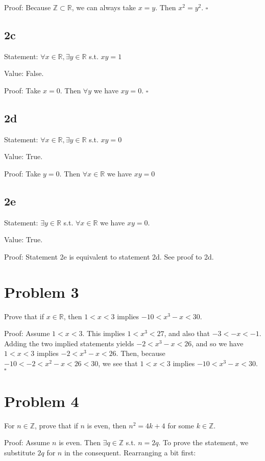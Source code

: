 \documentclass{article}
\begin{document}
Proof: Because $\mathbb{Z} \subset \mathbb{R}$, we can always take $x = y$. Then $x^2 = y^2$. $\square$
\subsection*{2c}
Statement: $\forall x \in \mathbb{R}, \exists y \in \mathbb{R}$ s.t. $xy = 1$

Value: False. 

Proof: Take $x = 0$. Then $\forall y$ we have $xy = 0.$ $\square$
\subsection*{2d}
Statement: $\forall x \in \mathbb{R}, \exists y \in \mathbb{R}$ s.t. $xy = 0$

Value: True. 

Proof: Take $y = 0$. Then $\forall x \in \mathbb{R}$ we have $xy = 0$
\subsection*{2e}
Statement: $\exists y \in \mathbb{R}$ s.t. $\forall x \in \mathbb{R}$ we have $xy = 0$. 

Value: True.

Proof: Statement 2e is equivalent to statement 2d. See proof to 2d. 

\section*{Problem 3}
Prove that if $x \in \mathbb{R}$, then $1 < x < 3$ implies $-10 < x^3 - x < 30$.  

Proof: Assume $1 < x < 3$. This implies $1 < x^3 < 27$, and also that  $-3 < -x < -1$. Adding the two implied statements yields $-2 < x^3 - x < 26$, and so we have $1 < x < 3 $ implies $-2 < x^3 - x < 26$. Then, because $-10 < -2 < x^2 - x < 26 < 30$, we see that $1 < x < 3$ implies $-10 < x^3 - x < 30$. $\square$

\newpage
\section*{Problem 4}
For $n \in \mathbb{Z}$, prove that if $n$ is even, then $n^2 = 4k + 4$ for some $k \in \mathbb{Z}$.  

Proof: Assume $n$ is even. Then $\exists q \in \mathbb{Z}$ s.t. $n = 2q$. 
To prove the statement, we substitute $2q$ for $n$ in the consequent. Rearranging a bit first: 
\end{document}
